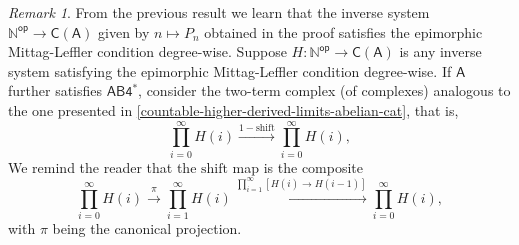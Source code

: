 \documentclass[reqno,11pt]{amsart}
\theoremstyle{plain}
\theoremstyle{remark}
\newtheorem*{rem}{Remark}
\theoremstyle{definition}
\numberwithin{equation}{thm}
\newcommand{\SA}{\mathsf{A}}
\newcommand{\CCC}{\boldsymbol{\mathsf{C}}}
\newcommand{\NN}{\mathbb{N}}
\newcommand{\op}{\mathsf{op}}
\begin{document}
	\begin{rem}
		
		From the previous result we learn that the inverse system $\NN^\op \to \CCC(\SA)$ given by $n \mapsto P_n$ obtained in the proof satisfies the epimorphic Mittag-Leffler condition degree-wise. Suppose $H \colon \NN^\op \to \CCC(\SA)$ is any inverse system satisfying the epimorphic Mittag-Leffler condition degree-wise. If $\SA$ further satisfies $\mathsf{AB4^*}$, consider the two-term complex (of complexes) analogous to the one presented in \ref{countable-higher-derived-limits-abelian-cat}, that is,
		\[
			\prod_{i=0}^{\infty} H(i) \xrightarrow{1 - \text{shift}} \prod_{i=0}^{\infty} H(i),
		\]
		We remind the reader that the $\text{shift}$ map is the composite 
		\[
			\prod_{i=0}^{\infty} H(i) \xrightarrow{\pi} \prod_{i=1}^{\infty} H(i) \xrightarrow{\prod_{i=1}^{\infty} [H(i) \to H(i-1)]} \prod_{i=0}^{\infty} H(i),
		\]
		with $\pi$ being the canonical projection.
		

\end{rem}
\end{document}
